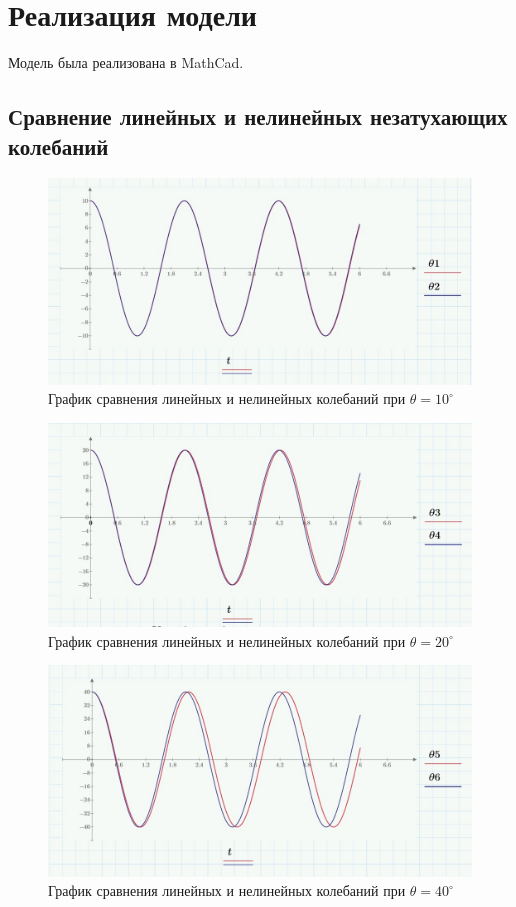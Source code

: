 \documentclass[a4paper, 14pt]{extarticle}
\begin{document}
	\pagebreak
	\section{Реализация модели}
		Модель была реализована в MathCad.
		\subsection{Сравнение линейных и нелинейных незатухающих колебаний}		
		\begin{figure}[H]
			\centering
			\includegraphics[width = \linewidth]{2.jpg}
			\caption[.] {График сравнения линейных и нелинейных колебаний при $\theta = 10^{\circ}$}
		\end{figure}
		\begin{figure}[H]
			\centering
			\includegraphics[width = \linewidth]{4.jpg}
			\caption[.] {График сравнения линейных и нелинейных колебаний при $\theta = 20^{\circ}$}
		\end{figure}
		\begin{figure}[H]
			\centering
			\includegraphics[width = \linewidth]{6.jpg}
			\caption[.] {График сравнения линейных и нелинейных колебаний при $\theta = 40^{\circ}$}
		\end{figure}
\end{document}
